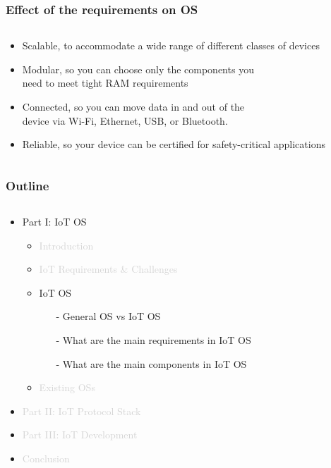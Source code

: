 \documentclass{beamer}
\begin{document}
\begin{frame}
	\frametitle{Effect of the requirements on OS}
	\begin{columns}[c]
		\begin{column}{30cm}
			\vspace{.1cm}
			\begin{itemize}
				\justifying
				\item \textcolor{TextOrange}{Scalable}, to accommodate a wide range of different
				 classes of devices
				\item \textcolor{TextGreen}{Modular}, so you can choose only the components you\\
				need to meet tight RAM requirements
				\item \textcolor{TextOrange}{Connected}, so you can move data in and out of the\\
				device via Wi-Fi, Ethernet, USB, or Bluetooth.
				\item \textcolor{TextGreen}{Reliable}, so your device can be certified for safety-critical
				applications
			\end{itemize}
		\end{column}
	\end{columns}
\end{frame}
\fi
\begin{frame}
	\frametitle{Outline}
	\begin{columns}[c]
		\begin{column}{30cm}
			\vspace{.1cm}
			\begin{itemize}
				\justifying
				\item Part I: IoT OS
				\begin{itemize}
					\item \textcolor{LightGray}{Introduction}
					\item \textcolor{LightGray}{IoT Requirements \& Challenges}
					\item {IoT OS}
					\begin{itemize}
						\item[-] General OS vs IoT OS
						\item[-] What are the main requirements in IoT OS
						\item[-] What are the main components in IoT OS
				\end{itemize}
					\item \textcolor{LightGray}{Existing OSs}
				\end{itemize}
				\item \textcolor{LightGray}{Part II: IoT Protocol Stack}
				\item \textcolor{LightGray}{Part III: IoT Development}
				\item \textcolor{LightGray}{Conclusion}
			\end{itemize}
		\end{column}
	\end{columns}
\end{frame}
\end{document}
